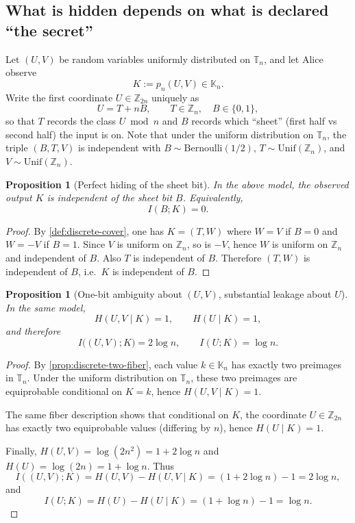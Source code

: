 \documentclass[11pt,a4paper]{article}
\newtheorem{proposition}[theorem]{Proposition}
\theoremstyle{definition}
\theoremstyle{remark}
\begin{document}
\subsection{What is hidden depends on what is declared ``the secret''}
\label{sec:what-is-secret}

Let \((U,V)\) be random variables uniformly distributed on \(\mathbb{T}_n\), and let Alice observe
\[
K := p_n(U,V)\in \mathbb{K}_n.
\]
Write the first coordinate \(U\in \mathbb{Z}_{2n}\) uniquely as
\[
U = T + nB,
\qquad
T\in\mathbb{Z}_n,\quad B\in\{0,1\},
\]
so that \(T\) records the class \(U\bmod n\) and \(B\) records which ``sheet'' (first half vs second half) the input is on. Note that under the uniform distribution on \(\mathbb{T}_n\), the triple \((B,T,V)\) is independent with \(B\sim \mathrm{Bernoulli}(1/2)\), \(T\sim \mathrm{Unif}(\mathbb{Z}_n)\), and \(V\sim \mathrm{Unif}(\mathbb{Z}_n)\).

\begin{proposition}[Perfect hiding of the sheet bit]
\label{prop:hide-bit}
In the above model, the observed output \(K\) is independent of the sheet bit \(B\). Equivalently,
\[
I(B;K)=0.
\]
\end{proposition}

\begin{proof}
By \cref{def:discrete-cover}, one has \(K=(T, W)\) where \(W=V\) if \(B=0\) and \(W=-V\) if \(B=1\). Since \(V\) is uniform on \(\mathbb{Z}_n\), so is \(-V\), hence \(W\) is uniform on \(\mathbb{Z}_n\) and independent of \(B\). Also \(T\) is independent of \(B\). Therefore \((T,W)\) is independent of \(B\), i.e.\ \(K\) is independent of \(B\).
\end{proof}

\begin{proposition}[One-bit ambiguity about \((U,V)\), substantial leakage about \(U\)]
\label{prop:leakage-u}
In the same model,
\[
H(U,V\mid K)=1,
\qquad
H(U\mid K)=1,
\]
and therefore
\[
I\bigl((U,V);K\bigr)=2\log n,
\qquad
I(U;K)=\log n.
\]
\end{proposition}

\begin{proof}
By \cref{prop:discrete-two-fiber}, each value \(k\in\mathbb{K}_n\) has exactly two preimages in \(\mathbb{T}_n\). Under the uniform distribution on \(\mathbb{T}_n\), these two preimages are equiprobable conditional on \(K=k\), hence \(H(U,V\mid K)=1\).

The same fiber description shows that conditional on \(K\), the coordinate \(U\in\mathbb{Z}_{2n}\) has exactly two equiprobable values (differing by \(n\)), hence \(H(U\mid K)=1\).

Finally, \(H(U,V)=\log(2n^2)=1+2\log n\) and \(H(U)=\log(2n)=1+\log n\). Thus
\[
I((U,V);K)=H(U,V)-H(U,V\mid K)=(1+2\log n)-1=2\log n,
\]
and
\[
I(U;K)=H(U)-H(U\mid K)=(1+\log n)-1=\log n.
\]
\end{proof}
\end{document}
